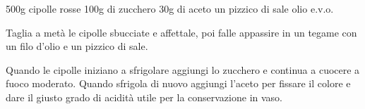 \begin{ingreds}
	500g cipolle rosse
	100g di zucchero
	30g di aceto
	un pizzico di sale
	olio e.v.o. 

\end{ingreds}

\begin{method}
Taglia a metà le cipolle sbucciate e affettale, poi falle appassire in un tegame con un filo d'olio e un pizzico di sale.

Quando le cipolle iniziano a sfrigolare aggiungi lo zucchero e continua a cuocere a fuoco moderato. Quando sfrigola di nuovo aggiungi l'aceto per fissare il colore e dare il giusto grado di acidità utile per la conservazione in vaso.



\end{method}



